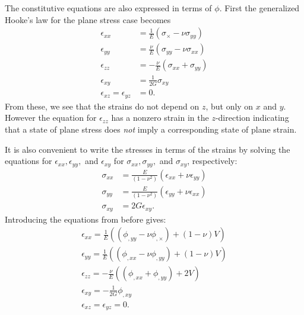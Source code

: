 The constitutive equations are also expressed in terms of $\phi$.
First the generalized Hooke's law for the plane stress case becomes
\begin{align*}
  \epsilon_{x x} &= \frac{1}{E} \left( \sigma_{\times} - \nu \sigma_{yy} \right) \\
  \epsilon_{yy} &= \frac{\nu}{E} \left( \sigma_{yy} - \nu \sigma_{x x} \right) \\
  \epsilon_{zz} &=  - \frac{\nu}{E} \left( \sigma_{x x} + \sigma_{yy} \right) \\
  \epsilon_{xy} &= \frac{1}{2G} \sigma_{xy} \\
  \epsilon_{xz} = \epsilon_{yz} &= 0
.\end{align*}
From these, we see that the strains do not depend on $z$, but only on $x$ and $y$.
However the equation for $\epsilon_{zz}$ has a nonzero strain in the $z$-direction indicating that a state of plane stress does \textit{not} imply a corresponding state of plane strain.

It is also convenient to write the stresses in terms of the strains by solving the equations for $\epsilon_{x x}, \epsilon_{yy},$ and $\epsilon_{xy}$ for $\sigma_{x x}, \sigma_{yy},$ and $\sigma_{xy}$, respectively:
\begin{align*}
  \sigma_{x x} &=  \frac{E}{\left( 1 - \nu^2 \right)} \left( \epsilon_{x x } + \nu \epsilon_{yy} \right) \\
  \sigma_{yy} &= \frac{E}{\left( 1 - \nu^2 \right)} \left( \epsilon_{yy} + \nu \epsilon_{x x} \right) \\
  \sigma_{xy} &= 2 G \epsilon_{xy}
.\end{align*}
Introducing the equations from before gives:
\begin{gather*}
  \epsilon_{x x} = \frac{1}{E} \left(  \left( \phi_{, yy} - \nu \phi_{, \times} \right) + \left( 1 - \nu \right) V \right) \\
  \epsilon_{yy} = \frac{1}{E} \left( \left( \phi_{, x x} - \nu \phi_{,yy}\right) + \left( 1 - \nu \right)V \right) \\
  \epsilon_{zz} = - \frac{\nu}{E} \left( \left( \phi_{,x x} + \phi_{,yy} \right) + 2V \right) \\
  \epsilon_{xy} = - \frac{1}{2G} \phi_{,xy} \\
  \epsilon_{xz} = \epsilon_{yz} = 0
.\end{gather*} 

